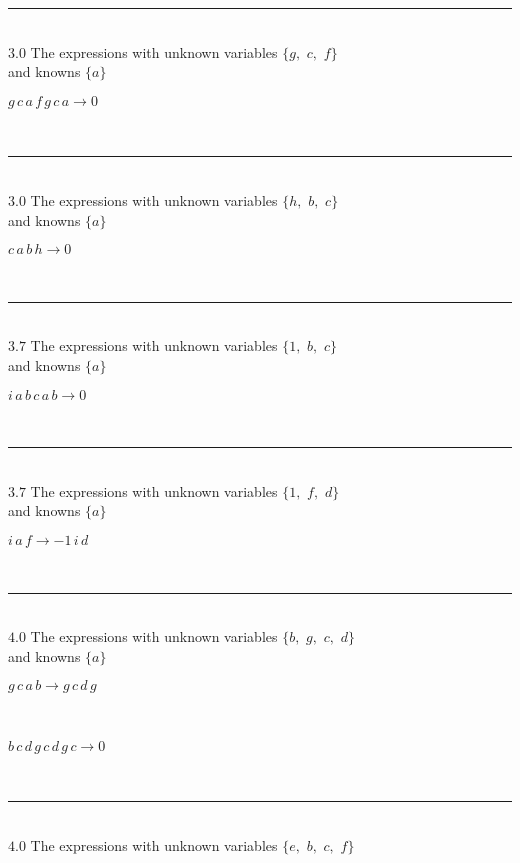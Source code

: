 \documentclass[rep10,leqno]{report}
\begin{document}
\rule[3pt]{6in}{.7pt}\\
$3.0$  The expressions with unknown variables $\{g,
$ $
c,
$ $
f\}$\\
and knowns $\{a\}$\smallskip\\
\begin{minipage}{6in}
$
g\,
 c\,
 a\,
 f\,
 g\,
 c\,
 a\rightarrow 0
$
\end{minipage}\\
\rule[3pt]{6in}{.7pt}\\
$3.0$  The expressions with unknown variables $\{h,
$ $
b,
$ $
c\}$\\
and knowns $\{a\}$\smallskip\\
\begin{minipage}{6in}
$
c\,
 a\,
 b\,
 h\rightarrow 0
$
\end{minipage}\\
\rule[3pt]{6in}{.7pt}\\
$3.7$  The expressions with unknown variables $\{1,
$ $
b,
$ $
c\}$\\
and knowns $\{a\}$\smallskip\\
\begin{minipage}{6in}
$
i\,
 a\,
 b\,
 c\,
 a\,
 b\rightarrow 0
$
\end{minipage}\\
\rule[3pt]{6in}{.7pt}\\
$3.7$  The expressions with unknown variables $\{1,
$ $
f,
$ $
d\}$\\
and knowns $\{a\}$\smallskip\\
\begin{minipage}{6in}
$
i\,
 a\,
 f\rightarrow -1\,
 i\,
 d
$
\end{minipage}\\
\rule[3pt]{6in}{.7pt}\\
$4.0$  The expressions with unknown variables $\{b,
$ $
g,
$ $
c,
$ $
d\}$\\
and knowns $\{a\}$\smallskip\\
\begin{minipage}{6in}
$
g\,
 c\,
 a\,
 b\rightarrow g\,
 c\,
 d\,
 g
$
\end{minipage}\medskip \\
\begin{minipage}{6in}
$
b\,
 c\,
 d\,
 g\,
 c\,
 d\,
 g\,
 c\rightarrow 0
$
\end{minipage}\\
\rule[3pt]{6in}{.7pt}\\
$4.0$  The expressions with unknown variables $\{e,
$ $
b,
$ $
c,
$ $
f\}$\\
\end{document}
